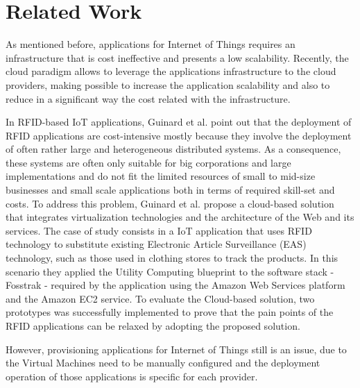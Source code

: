 \section{Related Work}
\label{sec:related_work}
As mentioned before, applications for Internet of Things requires an infrastructure that is cost ineffective and
presents a low scalability. Recently, the cloud paradigm allows to leverage the applications infrastructure to
the cloud providers, making possible to increase the application scalability and also to reduce in a significant
way the cost related with the infrastructure.

In RFID-based IoT applications, Guinard et al. \cite{guinard2011cloud} point out that the
deployment of RFID applications are cost-intensive mostly because they involve the
deployment of often rather large and heterogeneous distributed systems. As a consequence,
these systems are often only suitable for big corporations and large implementations and
do not fit the limited resources of small to mid-size businesses and small scale applications
both in terms of required skill-set and costs. To address this problem, Guinard et al. propose
a cloud-based solution that integrates virtualization technologies and the architecture of
the Web and its services. The case of study consists in a IoT application that uses RFID technology
to substitute existing Electronic Article Surveillance (EAS) technology, such as those used in
clothing stores to track the products. In this scenario they applied the Utility Computing blueprint
to the software stack - Fosstrak - required by the application using the Amazon Web Services platform and the
Amazon EC2 service. To evaluate the Cloud-based solution, two prototypes was successfully
implemented to prove that the pain points of the RFID applications can be relaxed by adopting the
proposed solution.

However, provisioning applications for Internet of Things still is an issue, due to the Virtual Machines
need to be manually configured and the deployment operation of those applications is specific for each
provider.

